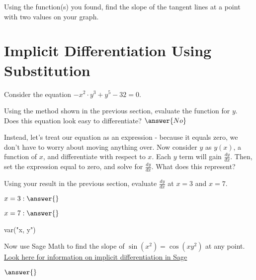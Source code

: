 \documentclass{ximera}
\begin{document}
\begin{question}
Using the function(s) you found, find the slope of the tangent lines at a point with two values on your graph.
\begin{freeResponse}
\end{freeResponse}
\end{question}
\setcounter{problem}{0}
\section{Implicit Differentiation Using Substitution}
Consider the equation $-x^2 \cdot y^3+y^5-32 = 0$.
\begin{question}
Using the method shown in the previous section, evaluate the function for $y$. Does this equation look easy to differentiate?
$\answer{No}$

Instead, let's treat our equation as an expression - because it equals zero, we don't have to worry about moving anything over. Now consider $y$ as $y(x)$, a function of $x$, and differentiate with respect to $x$. Each $y$ term will gain $\frac{dy}{dx}$. Then, set the expression equal to zero, and solve for $\frac{dy}{dx}$. What does this represent?
\begin{freeResponse}
\end{freeResponse}
\end{question}

\begin{question}
Using your result in the previous section, evaluate $\frac{dy}{dx}$ at $x = 3$ and $x = 7$.

$x = 3: \answer{}$

$x = 7: \answer{}$
\end{question}
\begin{question}
\begin{onlineOnly}
\begin{sageCell}
var("x, y")

\end{sageCell}
\end{onlineOnly}

Now use Sage Math to find the slope of  $\sin(x^2)=\cos(xy^2)$ at any point. \href{http://doc.sagemath.org/html/en/tutorial/tour_algebra.html#differentiation-integration-etc}{Look here for information on implicit differentiation in Sage}

$\answer{}$
\end{question}
\end{document}
